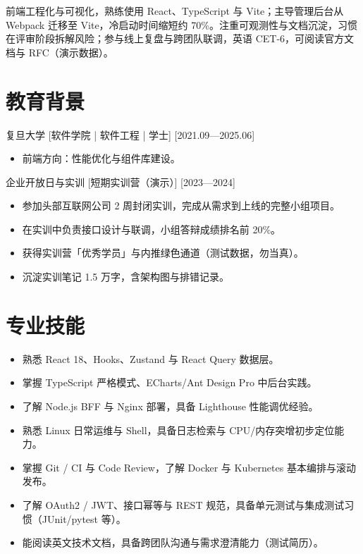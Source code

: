 \documentclass{resume-photo}
\begin{document}

\ResumeTitle

\noindent 前端工程化与可视化，熟练使用 React、TypeScript 与 Vite；主导管理后台从 Webpack 迁移至 Vite，冷启动时间缩短约 70\%。注重可观测性与文档沉淀，习惯在评审阶段拆解风险；参与线上复盘与跨团队联调，英语 CET-6，可阅读官方文档与 RFC（演示数据）。

\section{教育背景}
\ResumeItem
{复旦大学}
[\textnormal{软件学院 | 软件工程 | 学士}]
[2021.09—2025.06]

\begin{itemize}
  \item 前端方向：性能优化与组件库建设。
\end{itemize}


\ResumeItem
{企业开放日与实训}
[\textnormal{短期实训营（演示）}]
[2023—2024]

\begin{itemize}
  \item 参加头部互联网公司 2 周封闭实训，完成从需求到上线的完整小组项目。
  \item 在实训中负责接口设计与联调，小组答辩成绩排名前 20\%。
  \item 获得实训营「优秀学员」与内推绿色通道（测试数据，勿当真）。
  \item 沉淀实训笔记 1.5 万字，含架构图与排错记录。
\end{itemize}



\section{专业技能}
\begin{itemize}
  \item 熟悉 React 18、Hooks、Zustand 与 React Query 数据层。
  \item 掌握 TypeScript 严格模式、ECharts/Ant Design Pro 中后台实践。
  \item 了解 Node.js BFF 与 Nginx 部署，具备 Lighthouse 性能调优经验。
  \item 熟悉 Linux 日常运维与 Shell，具备日志检索与 CPU/内存突增初步定位能力。
  \item 掌握 Git / CI 与 Code Review，了解 Docker 与 Kubernetes 基本编排与滚动发布。
  \item 了解 OAuth2 / JWT、接口幂等与 REST 规范，具备单元测试与集成测试习惯（JUnit/pytest 等）。
  \item 能阅读英文技术文档，具备跨团队沟通与需求澄清能力（测试简历）。
\end{itemize}
\end{document}
